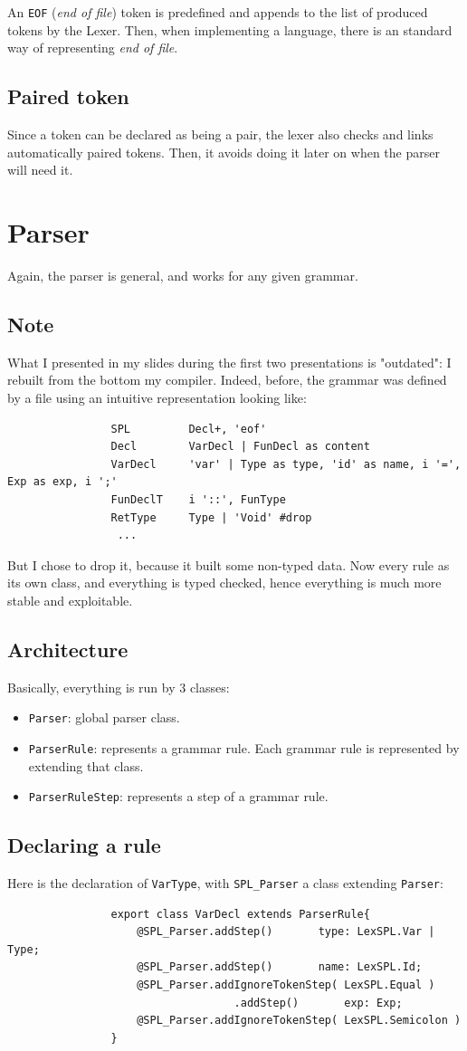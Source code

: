 \documentclass{article}
\newcommand\cc[1]{\lstinline{#1}}
\begin{document}
		An \cc{EOF} (\textit{end of file}) token is predefined and appends to the list of produced tokens by the Lexer. Then, when implementing a language, there is an standard way of representing \textit{end of file}.


		\subsection{Paired token}\label{pairedToken}
			Since a token can be declared as being a pair, the lexer also checks and links automatically paired tokens. Then, it avoids doing it later on when the parser will need it.

	\section{Parser}
		Again, the parser is general, and works for any given grammar.
		\subsection*{Note}
			What I presented in my slides during the first two presentations is "outdated": I rebuilt from the bottom my compiler. Indeed, before, the grammar was defined by a file using an intuitive representation looking like:
			 \begin{lstlisting}
			 	SPL			Decl+, 'eof'
			 	Decl		VarDecl | FunDecl as content
			 	VarDecl 	'var' | Type as type, 'id' as name, i '=', Exp as exp, i ';'
			 	FunDeclT	i '::', FunType
			 	RetType		Type | 'Void' #drop
			 	 ...
			 \end{lstlisting}
			But I chose to drop it, because it built some non-typed data. Now every rule as its own class, and everything is typed checked, hence everything is much more stable and exploitable. 
		\subsection{Architecture}
			Basically, everything is run by 3 classes:
			\begin{itemize}
				\item \cc{Parser}: global parser class.
				\item \cc{ParserRule}: represents a grammar rule. Each grammar rule is represented by extending that class. 
				\item \cc{ParserRuleStep}: represents a step of a grammar rule.
			\end{itemize}
		\subsection{Declaring a rule}
			Here is the declaration of \cc{VarType}, with \cc{SPL_Parser} a class extending \cc{Parser}:
			\label{VarTypeDef}\begin{lstlisting}
				export class VarDecl extends ParserRule{
					@SPL_Parser.addStep() 		type: LexSPL.Var | Type;
					@SPL_Parser.addStep() 		name: LexSPL.Id;
					@SPL_Parser.addIgnoreTokenStep( LexSPL.Equal )
							       .addStep() 		exp: Exp;
					@SPL_Parser.addIgnoreTokenStep( LexSPL.Semicolon )
				}
			\end{lstlisting}
\end{document}
